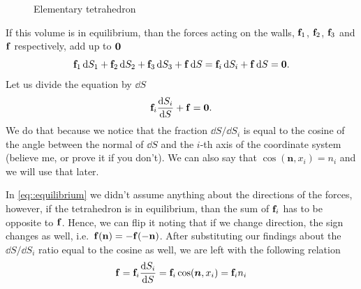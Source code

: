 \documentclass[a4paper]{article}
\begin{document}
\begin{figure}[bh!]
	\caption{Elementary tetrahedron}
	\label{fig::force_tetrahedron}
\end{figure}

If this volume is in equilibrium, than the forces acting on the walls,
\(\vb{f}_1\), \(\vb{f}_2\), \(\vb{f}_3\) and \(\vb{f}\) respectively,
add up to \(\vb{0}\)
\begin{equation}\label{eq::equilibrium}
	\vb{f}_1 \dd{S_1}
	+ \vb{f}_2 \dd{S_2}
	+ \vb{f}_3 \dd{S_3}
	+ \vb{f} \dd{S} = \vb{f}_i \dd{S_i} + \vb{f} \dd{S} = \vb{0}.
\end{equation}
Let us divide the equation by \(\dd{S}\)
\[
	\vb{f}_i \dfrac{\dd{S_i}}{\dd{S}} + \vb{f} = \vb{0}.
\]
We do that because we notice that the fraction \(\dd{S} / \dd{S_i}\) is
equal to the cosine of the angle between the normal of \(\dd{S}\) and
the \(i\)-th axis of the coordinate system (believe me, or prove it
if you don't). We can also say that \(\cos(\bm{n}, x_i) = n_i\) and we will
use that later.

In \autoref{eq::equilibrium} we didn't assume anything about the directions
of the forces, however, if the tetrahedron is in equilibrium, than the sum of
\(\vb{f}_i\) has to be opposite to \(\vb{f}\). Hence, we can flip it noting
that if we change direction, the sign changes as well, i.e.\
\(\vb{f}(\vb{n}) = -\vb{f}(-\vb{n})\).
After substituting our  findings about the
\(\dd{S} / \dd{S_i}\) ratio equal to the cosine as well, we are left with the following relation
\[
	\vb{f} = \vb{f}_i \dfrac{\dd{S_i}}{\dd{S}}
	= \vb{f}_i\cos(\bm{n}, x_i)
	= \vb{f}_i n_i
\]
\end{document}
